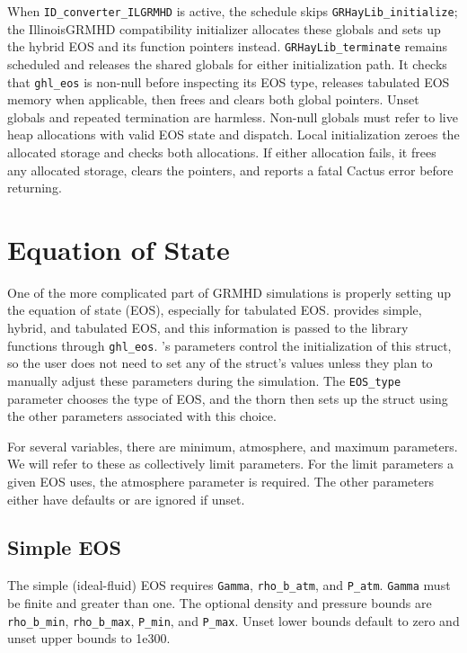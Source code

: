 \documentclass{article}
\begin{document}
When \texttt{ID\_converter\_ILGRMHD} is active, the schedule skips
\texttt{GRHayLib\_initialize}; the IllinoisGRMHD compatibility initializer
allocates these globals and sets up the hybrid EOS and its function pointers
instead. \texttt{GRHayLib\_terminate} remains scheduled and releases the
shared globals for either initialization path. It checks that
\texttt{ghl\_eos} is non-null before inspecting its EOS type, releases
tabulated EOS memory when applicable, then frees and clears both global
pointers. Unset globals and repeated termination are harmless. Non-null
globals must refer to live heap allocations with valid EOS state and dispatch.
Local initialization zeroes the allocated storage and checks both allocations.
If either allocation fails, it frees any allocated storage, clears the pointers,
and reports a fatal Cactus error before returning.

\section{Equation of State}

One of the more complicated part of GRMHD simulations is properly
setting up the equation of state (EOS), especially for tabulated EOS.
\grhayl{} provides simple, hybrid, and tabulated EOS, and this information
is passed to the library functions through \texttt{ghl\_eos}. \glib's
parameters control the initialization of this struct, so the user does
not need to set any of the struct's values unless they plan to manually
adjust these parameters during the simulation. The \texttt{EOS\_type}
parameter chooses the type of EOS, and the thorn then sets up the struct
using the other parameters associated with this choice.

For several variables, there are minimum, atmosphere, and maximum parameters.
We will refer to these as collectively limit parameters. For the limit
parameters a given EOS uses, the atmosphere parameter is required. The other
parameters either have defaults or are ignored if unset.

\subsection{Simple EOS}

The simple (ideal-fluid) EOS requires \texttt{Gamma}, \texttt{rho\_b\_atm},
and \texttt{P\_atm}. \texttt{Gamma} must be finite and greater than one.
The optional density and pressure bounds are \texttt{rho\_b\_min},
\texttt{rho\_b\_max}, \texttt{P\_min}, and \texttt{P\_max}. Unset lower
bounds default to zero and unset upper bounds to 1e300.
\end{document}
